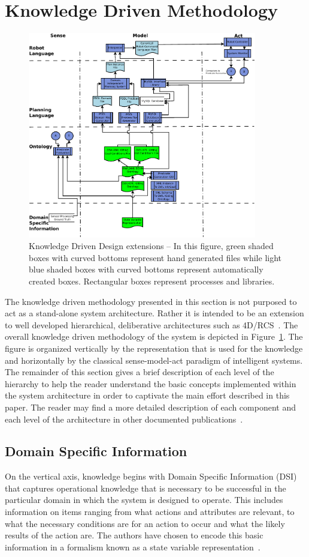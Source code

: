 \section{Knowledge Driven Methodology}
\label{sect:architecture}
\begin{figure}[!t!h!b!]
\centering
\includegraphics[width=10cm]{images/KnowledgeDrivenRobotics.pdf}
\caption{Knowledge Driven Design extensions -- In this figure, green shaded
  boxes with curved bottoms represent hand generated files while light blue
  shaded boxes with curved bottoms represent automatically created boxes.
  Rectangular boxes represent processes and libraries. }
\label{fig:methodology}
\end{figure}
The knowledge driven methodology presented in this section is not purposed
to act as a stand-alone system architecture. Rather it is intended to be an
extension to well developed hierarchical, deliberative architectures such
as 4D/RCS~\cite{Albus2000}. The overall knowledge driven methodology of the
system is depicted in Figure~\ref{fig:methodology}. The figure is organized
vertically by the representation that is used for the knowledge and
horizontally by the classical sense-model-act paradigm of intelligent
systems. The remainder of this section gives a brief description of each
level of the hierarchy to help the reader understand the basic concepts
implemented within the system architecture in order to captivate the main effort described in this paper. The reader may find a more
detailed description of each component and each level of the architecture
in other documented
publications~\cite{BALAKIRSKY.IROS.2012}.

\subsection{Domain Specific Information}
On the vertical axis, knowledge begins with Domain Specific Information
(DSI) that captures operational knowledge that is necessary to be
successful in the particular domain in which the system is designed to
operate. This includes information on items ranging from what actions and
attributes are relevant, to what the necessary conditions are for an action
to occur and what the likely results of the action are. The authors have
chosen to encode this basic information in a formalism known as a state
variable representation~\cite{NAU.2004}.

